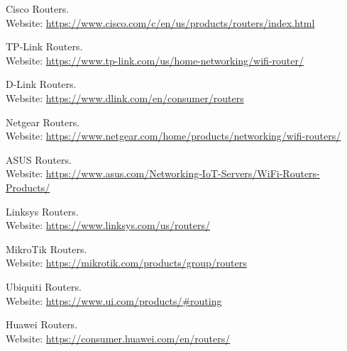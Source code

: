\documentclass[11pt]{article}
\begin{document}
\begin{thebibliography}{99}
  Cisco Routers. \\
  Website: \url{https://www.cisco.com/c/en/us/products/routers/index.html}

  TP-Link Routers. \\
  Website: \url{https://www.tp-link.com/us/home-networking/wifi-router/}

  D-Link Routers. \\
  Website: \url{https://www.dlink.com/en/consumer/routers}

  Netgear Routers. \\
  Website: \url{https://www.netgear.com/home/products/networking/wifi-routers/}

  ASUS Routers. \\
  Website: \url{https://www.asus.com/Networking-IoT-Servers/WiFi-Routers-Products/}

  Linksys Routers. \\
  Website: \url{https://www.linksys.com/us/routers/}

  MikroTik Routers. \\
  Website: \url{https://mikrotik.com/products/group/routers}

  Ubiquiti Routers. \\
  Website: \url{https://www.ui.com/products/#routing}

  Huawei Routers. \\
  Website: \url{https://consumer.huawei.com/en/routers/}
\end{thebibliography}
\end{document}
